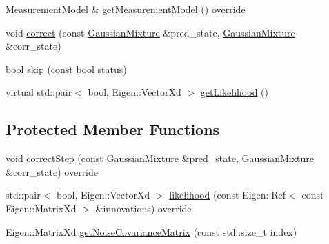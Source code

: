 \begin{DoxyCompactItemize}
\mbox{\hyperlink{classbfl_1_1MeasurementModel}{Measurement\+Model}} \& \mbox{\hyperlink{classbfl_1_1SUKFCorrection_a499e3b64cc82faa71227e9ed47fc78b8}{get\+Measurement\+Model}} () override
\item 
void \mbox{\hyperlink{classbfl_1_1GaussianCorrection_a6308c8af37a1a451eba8e87e73952c84}{correct}} (const \mbox{\hyperlink{classbfl_1_1GaussianMixture}{Gaussian\+Mixture}} \&pred\+\_\+state, \mbox{\hyperlink{classbfl_1_1GaussianMixture}{Gaussian\+Mixture}} \&corr\+\_\+state)
\item 
bool \mbox{\hyperlink{classbfl_1_1GaussianCorrection_a986b05b149650ea4dd725b10700db57f}{skip}} (const bool status)
\item 
virtual std\+::pair$<$ bool, Eigen\+::\+Vector\+Xd $>$ \mbox{\hyperlink{classbfl_1_1GaussianCorrection_a955702adbdad6448d8f306752d3d0868}{get\+Likelihood}} ()
\end{DoxyCompactItemize}
\subsection*{Protected Member Functions}
\begin{DoxyCompactItemize}
\item 
void \mbox{\hyperlink{classbfl_1_1SUKFCorrection_af58d64c5e6c1ef373df94e4c4179226b}{correct\+Step}} (const \mbox{\hyperlink{classbfl_1_1GaussianMixture}{Gaussian\+Mixture}} \&pred\+\_\+state, \mbox{\hyperlink{classbfl_1_1GaussianMixture}{Gaussian\+Mixture}} \&corr\+\_\+state) override
\item 
std\+::pair$<$ bool, Eigen\+::\+Vector\+Xd $>$ \mbox{\hyperlink{classbfl_1_1SUKFCorrection_a3217ddd6a205ff94de69e3b6d8de1fbe}{likelihood}} (const Eigen\+::\+Ref$<$ const Eigen\+::\+Matrix\+Xd $>$ \&innovations) override
\item 
Eigen\+::\+Matrix\+Xd \mbox{\hyperlink{classbfl_1_1SUKFCorrection_a65cad252b30972be380a1078902e5c84}{get\+Noise\+Covariance\+Matrix}} (const std\+::size\+\_\+t index)
\end{DoxyCompactItemize}
